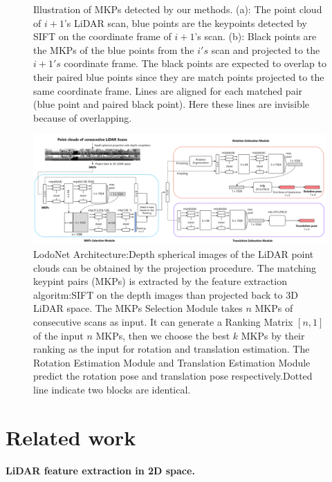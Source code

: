 \documentclass[sigconf]{acmart}
\def\lodo{LodoNet}
\newcommand{\bfsection}[1]{\vspace*{0.1cm}\noindent\textbf{#1.}}
\begin{document}
\begin{figure}[t!]
        \caption{Illustration of MKPs detected by our methods. (a): The point cloud of $i+1$'s LiDAR scan, blue points are the keypoints detected by SIFT on the coordinate frame of  $i+1$'s scan. (b): Black points are the MKPs of the blue points from the $i's$ scan and projected to the $i+1's$ coordinate frame. The black points are expected to overlap to their paired blue points since they are match points projected to the same coordinate frame. Lines are aligned for each matched pair (blue point and paired black point). Here these lines are invisible because of overlapping. }
        \label{fig:matching3D}
\end{figure}


\begin{figure}[h]
  \centering
  \includegraphics[height=0.32\textwidth]{Figures/network.png}
  \caption{\lodo{} Architecture:Depth spherical images of the LiDAR point clouds can be obtained by the projection procedure. The matching keypint pairs (MKPs) is extracted by the feature extraction algoritm:SIFT on the depth images than projected back to 3D LiDAR space. The MKPs Selection Module takes $n$ MKPs of consecutive scans as input. It can generate a Ranking Matrix $[n, 1]$ of the input $n$ MKPs, then we choose the best $k$ MKPs by their ranking as the input for rotation and translation estimation. The Rotation Estimation Module and Translation Estimation Module predict the rotation pose and translation pose respectively.Dotted line indicate two blocks are identical.}
  \label{fig:network}
\end{figure}

\section{Related work}
\bfsection{LiDAR feature extraction in 2D space}
\end{document}
